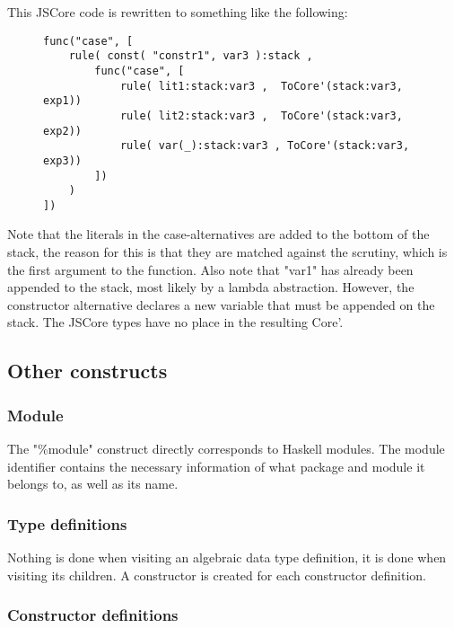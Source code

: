 This JSCore code is rewritten to something like the following:

\begin{figure}[H]
\lstset{ %
language=Haskell,
caption=JSCore case expression in Core',
}
\begin{lstlisting}
func("case", [
    rule( const( "constr1", var3 ):stack ,
        func("case", [  
            rule( lit1:stack:var3 ,  ToCore'(stack:var3, exp1))
            rule( lit2:stack:var3 ,  ToCore'(stack:var3, exp2))
            rule( var(_):stack:var3 , ToCore'(stack:var3, exp3))
        ])
    )
])
\end{lstlisting}
\end{figure}

Note that the literals in the case-alternatives are added to the bottom of the stack,
the reason for this is that they are matched against the scrutiny, which is the first
argument to the function.
Also note that "var1" has already
been appended to the stack, most likely by a lambda abstraction. However, 
the constructor
alternative declares a new variable that must be appended on the stack.
The JSCore types have no place in the resulting Core'.

\subsection*{Other constructs}

\subsubsection*{Module}

The "\%module" construct directly corresponds to Haskell modules. The module identifier
contains the necessary information of what package and module it belongs to, as
well as its name.

\subsubsection*{Type definitions}

Nothing is done when visiting an algebraic data type definition, it is done when 
visiting its children. A constructor is created for each constructor definition.

\subsubsection*{Constructor definitions}

